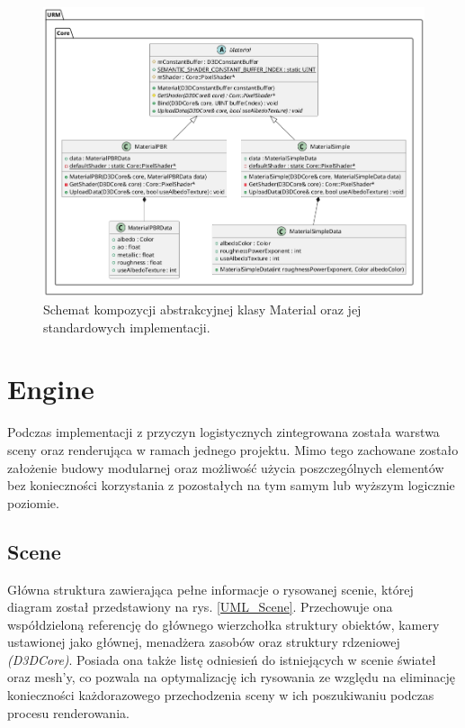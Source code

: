 	\begin{figure}[h!]
		\centering
		\includegraphics[width=\textwidth]{images/UML/materials.png}
		\caption{Schemat kompozycji abstrakcyjnej klasy Material oraz jej standardowych implementacji.}
		\label{UML_Material}
	\end{figure}
	
	\vfill
	\clearpage
	
\section{Engine}
	Podczas implementacji z przyczyn logistycznych zintegrowana została warstwa sceny oraz renderująca w ramach jednego projektu. Mimo tego zachowane zostało założenie budowy modularnej oraz możliwość użycia poszczególnych elementów bez konieczności korzystania z pozostałych na tym samym lub wyższym logicznie poziomie.
	
\subsection{Scene}
	Główna struktura zawierająca pełne informacje o rysowanej scenie, której diagram został przedstawiony na rys. \ref{UML_Scene}. Przechowuje ona współdzieloną referencję do głównego wierzchołka struktury obiektów, kamery ustawionej jako głównej, menadżera zasobów oraz struktury rdzeniowej \textit{(D3DCore)}. Posiada ona także listę odniesień do istniejących w scenie świateł oraz mesh'y, co pozwala na optymalizację ich rysowania ze względu na eliminację konieczności każdorazowego przechodzenia sceny w ich poszukiwaniu podczas procesu renderowania.
	
